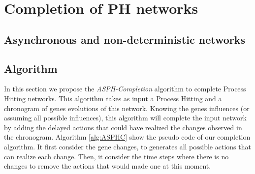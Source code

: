 
\section{Completion of PH networks}

\subsection{Asynchronous and non-deterministic networks}

\subsection{Algorithm}

In this section we propose the {\it ASPH-Completion} algorithm to complete Process Hitting networks.
This algorithm takes as input a Process Hitting and a chronogram of genes evolutions of this network.
Knowing the genes influences (or assuming all possible influences),
this algorithm will complete the input network by adding the delayed actions that could have realized the changes observed in the chronogram.
Algorithm \ref{alg:ASPHC} show the pseudo code of our completion algorithm.
It first consider the gene changes, to generates all possible actions that can realize each change.
Then, it consider the time steps where there is no changes to remove the actions that would made one at this moment.

